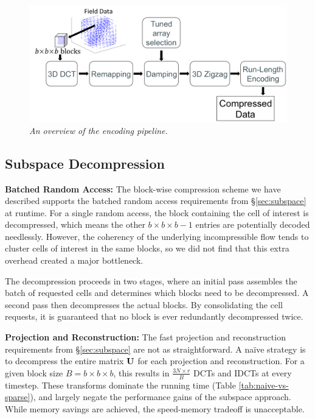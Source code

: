 \begin{figure}
\label{fig:flowchart}
\includegraphics[width=\textwidth]{chap4/figures/compression_flowchart.png}
\caption{\em An overview of the encoding pipeline.}
\end{figure}


\subsection{Subspace Decompression}
\label{sec:decompress}

\noindent \textbf{Batched Random Access:} The block-wise compression scheme we have described supports the batched random access requirements from \S\ref{sec:subspace} at runtime. For a single random access, the block containing the cell of interest is decompressed, which means the other $b \times b \times b - 1$ entries are potentially decoded needlessly. However, the coherency of the underlying incompressible flow tends to cluster cells of interest in the same blocks, so we did not find that this extra overhead created a major bottleneck.

The decompression proceeds in two stages, where an initial pass assembles the batch of requested cells and determines which blocks need to be decompressed. A second pass then decompresses the actual blocks. By consolidating the cell requests, it is guaranteed that no block is ever redundantly decompressed twice.

\noindent \textbf{Projection and Reconstruction:} The fast projection and reconstruction requirements from \S\ref{sec:subspace} are not as straightforward. A na\"{i}ve strategy is to decompress the entire matrix $\mathbf{U}$ for each projection and reconstruction. For a given block size $B = b \times b \times b$, this results in $\frac{3N \times r}{B}$ DCTs and IDCTs at every timestep. These transforms dominate the running time (Table \ref{tab:naive-vs-sparse}), and largely negate the performance gains of the subspace approach. While memory savings are achieved, the speed-memory tradeoff is unacceptable.

